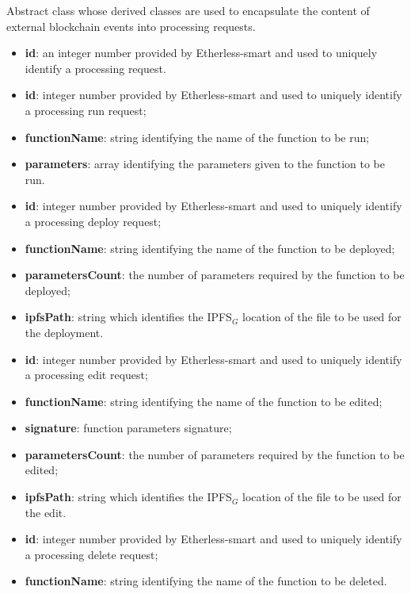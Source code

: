	Abstract class whose derived classes are used to encapsulate the content of external blockchain events into processing requests.
	\begin{itemize}
		\item \textbf{id}: an integer number provided by Etherless-smart and used to uniquely identify a processing request.
	\end{itemize}
	\begin{itemize}
		\item \textbf{id}: integer number provided by Etherless-smart and used to uniquely identify a processing run request;
		\item \textbf{functionName}: string identifying the name of the function to be run;
		\item \textbf{parameters}: array identifying the parameters given to the function to be run.
	\end{itemize}
	\begin{itemize}
		\item \textbf{id}: integer number provided by Etherless-smart and used to uniquely identify a processing deploy request;
		\item \textbf{functionName}: string identifying the name of the function to be deployed;
		\item \textbf{parametersCount}: the number of parameters required by the function to be deployed;
		\item \textbf{ipfsPath}: string which identifies the IPFS$_{G}$ location of the file to be used for the deployment.
	\end{itemize}
	\begin{itemize}
		\item \textbf{id}: integer number provided by Etherless-smart and used to uniquely identify a processing edit request;
		\item \textbf{functionName}: string identifying the name of the function to be edited;
		\item \textbf{signature}: function parameters signature;
		\item \textbf{parametersCount}: the number of parameters required by the function to be edited;
		\item \textbf{ipfsPath}: string which identifies the IPFS$_{G}$ location of the file to be used for the edit.
	\end{itemize}
	\begin{itemize}
		\item \textbf{id}: integer number provided by Etherless-smart and used to uniquely identify a processing delete request;
		\item \textbf{functionName}: string identifying the name of the function to be deleted.
	\end{itemize}

